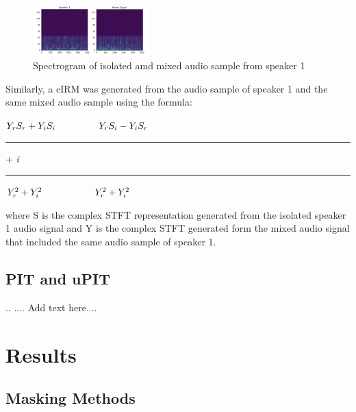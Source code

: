 \documentclass[journal, a4paper]{IEEEtran}
\begin{document}
\begin{figure}[h!]
    \centering  
     \caption{\label{Fig:Spectrogram of isolated amd mixed audio sample from speaker 1}Spectrogram of isolated amd mixed audio sample from speaker 1}  
    \includegraphics[width=0.4\textwidth]{cIRM_same.png}  
\end{figure}

Similarly, a cIRM was generated from the audio sample of speaker 1 and the same mixed audio sample using the formula:

\begin{center}
$Y_r S_r + Y_i S_i \hspace{1.6cm} Y_r S_i - Y_i S_r$

\rule[3pt]{45pt}{.4pt} \hspace{.3cm} + \hspace{.4cm} \textit{i} \hspace{.1cm} \rule[3pt]{45pt}{.4pt}


$Y_r^2 + Y_i^2  \hspace{2.0cm} Y_r^2 + Y_i^2$

\end{center}

\begin{flushleft}
where S is the complex STFT representation generated from the isolated speaker 1 audio signal and Y is the complex STFT generated form the mixed audio signal that included the same audio sample of speaker 1.\cite{DBLP:journals/corr/abs-1708-07524}
\end{flushleft}

\subsection{PIT and uPIT}

..
.... Add text here....


\section{Results}

\subsection{Masking Methods}
\end{document}
